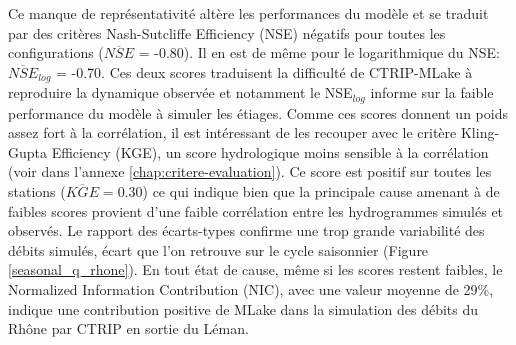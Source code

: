 \noindent Ce manque de représentativité altère les performances du modèle et se traduit par des critères Nash-Sutcliffe Efficiency (NSE) négatifs pour toutes les configurations ($\overline{NSE}$ = -0.80). Il en est de même pour le logarithmique du NSE: $\overline{NSE}_{log}$ = -0.70. Ces deux scores traduisent la difficulté de CTRIP-MLake à reproduire la dynamique observée et notamment le NSE$_{log}$ informe sur la faible performance du modèle à simuler les étiages. Comme ces scores donnent un poids assez fort à la corrélation, il est intéressant de les recouper avec le critère Kling-Gupta Efficiency (KGE), un score hydrologique moins sensible à la corrélation (voir dans l'annexe \ref{chap:critere-evaluation}). Ce score est positif sur toutes les stations ($\overline{KGE}=0.30$) ce qui indique bien que la principale cause amenant à de faibles scores provient d'une faible corrélation entre les hydrogrammes simulés et observés. Le rapport des écarts-types confirme une trop grande variabilité des débits simulés, écart que l'on retrouve sur le cycle saisonnier (Figure \ref{seasonal_q_rhone}). En tout état de cause, même si les scores restent faibles, le Normalized Information Contribution (NIC), avec une valeur moyenne de 29\%, indique une contribution positive de MLake dans la simulation des débits du Rhône par CTRIP en sortie du Léman.\\

